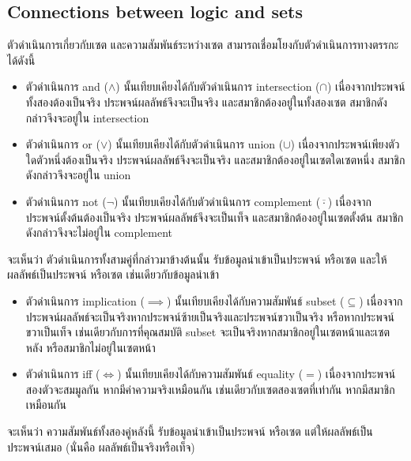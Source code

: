 \subsection{Connections between logic and sets}

ตัวดำเนินการเกี่ยวกับเซต และความสัมพันธ์ระหว่างเซต สามารถเชื่อมโยงกับตัวดำเนินการทางตรรกะได้ดังนี้
\begin{itemize}[]
\item ตัวดำเนินการ and ($\wedge$) นั้นเทียบเคียงได้กับตัวดำเนินการ intersection ($\cap$) เนื่องจากประพจน์ทั้งสองต้องเป็นจริง ประพจน์ผลลัพธ์จึงจะเป็นจริง และสมาชิกต้องอยู่ในทั้งสองเซต สมาชิกดังกล่าวจึงจะอยู่ใน intersection
\item ตัวดำเนินการ or ($\vee$) นั้นเทียบเคียงได้กับตัวดำเนินการ union ($\cup$) เนื่องจากประพจน์เพียงตัวใดตัวหนึ่งต้องเป็นจริง ประพจน์ผลลัพธ์จึงจะเป็นจริง และสมาชิกต้องอยู่ในเซตใดเซตหนึ่ง สมาชิกดังกล่าวจึงจะอยู่ใน union
\item ตัวดำเนินการ not ($\neg$) นั้นเทียบเคียงได้กับตัวดำเนินการ complement ($\overline{\cdot}$) เนื่องจากประพจน์ตั้งต้นต้องเป็นจริง ประพจน์ผลลัพธ์จึงจะเป็นเท็จ และสมาชิกต้องอยู่ในเซตตั้งต้น สมาชิกดังกล่าวจึงจะไม่อยู่ใน complement
\end{itemize}
จะเห็นว่า ตัวดำเนินการทั้งสามคู่ที่กล่าวมาข้างต้นนั้น รับข้อมูลนำเข้าเป็นประพจน์ หรือเซต และให้ผลลัพธ์เป็นประพจน์ หรือเซต เช่นเดียวกับข้อมูลนำเข้า
\begin{itemize}[]
\item ตัวดำเนินการ implication ($\implies$) นั้นเทียบเคียงได้กับความสัมพันธ์ subset ($\subseteq$) เนื่องจากประพจน์ผลลัพธ์จะเป็นจริงหากประพจน์ซ้ายเป็นจริงและประพจน์ขวาเป็นจริง หรือหากประพจน์ขวาเป็นเท็จ เช่นเดียวกับการที่คุณสมบัติ subset จะเป็นจริงหากสมาชิกอยู่ในเซตหน้าและเซตหลัง หรือสมาชิกไม่อยู่ในเซตหน้า
\item ตัวดำเนินการ iff ($\iff$) นั้นเทียบเคียงได้กับความสัมพันธ์ equality ($=$) เนื่องจากประพจน์สองตัวจะสมมูลกัน หากมีค่าความจริงเหมือนกัน เช่นเดียวกับเซตสองเซตที่เท่ากัน หากมีสมาชิกเหมือนกัน
\end{itemize}
จะเห็นว่า ความสัมพันธ์ทั้งสองคู่หลังนี้ รับข้อมูลนำเข้าเป็นประพจน์ หรือเซต แต่ให้ผลลัพธ์เป็นประพจน์เสมอ (นั่นคือ ผลลัพธ์เป็นจริงหรือเท็จ)

